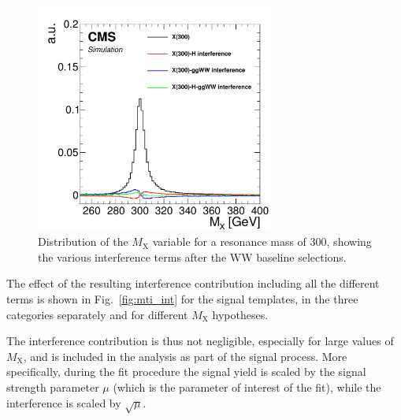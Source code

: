 \begin{figure}[htb]
\centering
\includegraphics[width=0.7\textwidth]{images/13TeV/Interference/int300.pdf}
\caption{
    Distribution of the $M_\mathrm{X}$ variable for a resonance mass of 300\GeV, showing the various interference terms after the WW baseline selections.}
    \label{fig:int300}
\end{figure}

The effect of the resulting interference contribution including all the different terms is shown in Fig.~\ref{fig:mti_int} for the \mti signal templates, in the three categories separately and for different $M_\mathrm{X}$ hypotheses.

The interference contribution is thus not negligible, especially for large values of $M_\mathrm{X}$, and is included in the analysis as part of the signal process. More specifically, during the fit procedure the signal yield is scaled by the signal strength parameter $\mu$ (which is the parameter of interest of the fit), while the interference is scaled by $\sqrt{\mu}$.

